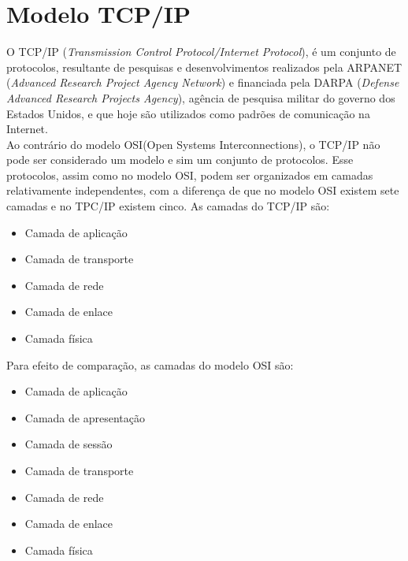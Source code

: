 \section{Modelo TCP/IP}
O TCP/IP (\textit{Transmission Control Protocol/Internet Protocol}), é um conjunto de protocolos, resultante de pesquisas e desenvolvimentos realizados pela ARPANET (\textit{Advanced Research Project Agency Network}) e financiada pela DARPA (\textit{Defense Advanced Research Projects Agency}), agência de pesquisa militar do governo dos Estados Unidos, e que hoje são utilizados como padrões de comunicação na Internet.\\
Ao contrário do modelo OSI(Open Systems Interconnections), o TCP/IP não pode 
ser considerado um modelo e sim um conjunto de protocolos. Esse protocolos, 
assim como no modelo OSI, podem ser organizados em camadas relativamente 
independentes, com a diferença de que no modelo OSI existem sete camadas e no 
TPC/IP existem cinco. As camadas do TCP/IP são:
\begin{itemize}
	\item Camada de aplicação
	\item Camada de transporte
	\item Camada de rede
	\item Camada de enlace
	\item Camada física
\end{itemize}
Para efeito de comparação, as camadas do modelo OSI são:
\begin{itemize}
	\item Camada de aplicação
	\item Camada de apresentação
	\item Camada de sessão
	\item Camada de transporte
	\item Camada de rede
	\item Camada de enlace
	\item Camada física
\end{itemize}

